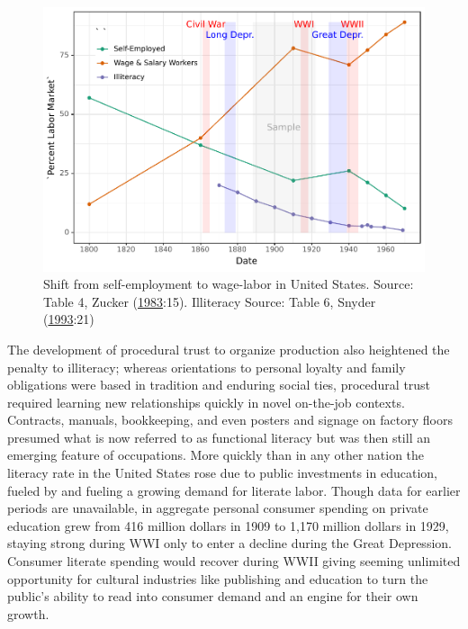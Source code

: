 \documentclass[]{book}
\theoremstyle{definition}
\theoremstyle{definition}
\theoremstyle{definition}
\theoremstyle{remark}
\begin{document}
\begin{figure}

{\centering \includegraphics[width=0.9\linewidth]{04_files/figure-latex/zuck1-1} 

}

\caption{Shift from self-employment to wage-labor in United States.
Source: Table 4, Zucker
(\protect\hyperlink{ref-Zucker1983Organizations}{1983}:15). Illiteracy
Source: Table 6, Snyder (\protect\hyperlink{ref-Snyder1993120}{1993}:21)}\label{fig:zuck1}
\end{figure}

The development of procedural trust to organize production also
heightened the penalty to illiteracy; whereas orientations to personal
loyalty and family obligations were based in tradition and enduring
social ties, procedural trust required learning new relationships
quickly in novel on-the-job contexts. Contracts, manuals, bookkeeping,
and even posters and signage on factory floors presumed what is now
referred to as functional literacy but was then still an emerging
feature of occupations. More quickly than in any other nation the
literacy rate in the United States rose due to public investments in
education, fueled by and fueling a growing demand for literate labor.
Though data for earlier periods are unavailable, in aggregate personal
consumer spending on private education grew from 416 million dollars in
1909 to 1,170 million dollars in 1929, staying strong during WWI only to
enter a decline during the Great Depression. Consumer literate spending
would recover during WWII giving seeming unlimited opportunity for
cultural industries like publishing and education to turn the public's
ability to read into consumer demand and an engine for their own growth.
\end{document}
